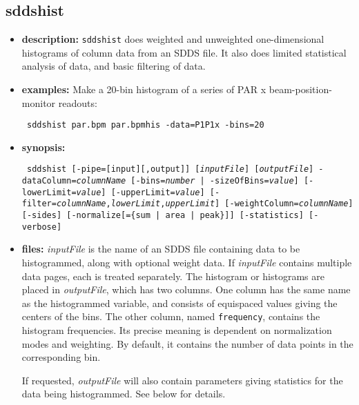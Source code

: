 \newpage
\subsection{sddshist}
\label{sddshist}

\begin{itemize}
\item {\bf description:} 
{\tt sddshist} does weighted and unweighted one-dimensional histograms of column data from an SDDS file.
It also does limited statistical analysis of data, and basic filtering of data.
\item {\bf examples:} 
Make a 20-bin histogram of a series of PAR x beam-position-monitor readouts:
\begin{flushleft}{\tt
sddshist par.bpm par.bpmhis -data=P1P1x -bins=20
}\end{flushleft}
\item {\bf synopsis:} 
\begin{flushleft}{\tt
sddshist [-pipe=[input][,output]] [{\em inputFile}] [{\em outputFile}]
-dataColumn={\em columnName} [{-bins={\em number} | -sizeOfBins={\em value}}] 
[-lowerLimit={\em value}] [-upperLimit={\em value}] [-filter={\em columnName},{\em lowerLimit},{\em upperLimit}] 
[-weightColumn={\em columnName}] [-sides] [-normalize[=\{sum | area | peak\}]] 
[-statistics] [-verbose]
}\end{flushleft}
\item {\bf files:}
{\em inputFile} is the name of an SDDS file containing data to be
histogrammed, along with optional weight data.  If {\em inputFile}
contains multiple data pages, each is treated separately.  The
histogram or histograms are placed in {\em outputFile}, which has two
columns.  One column has the same name as the histogrammed variable,
and consists of equispaced values giving the centers of the bins.  The
other column, named {\tt frequency}, contains the histogram
frequencies. Its precise meaning is dependent on normalization modes
and weighting.  By default, it contains the number of data points in
the corresponding bin.  

If requested, {\em outputFile} will also contain parameters giving
statistics for the data being histogrammed.  See below for details.


\end{itemize}
